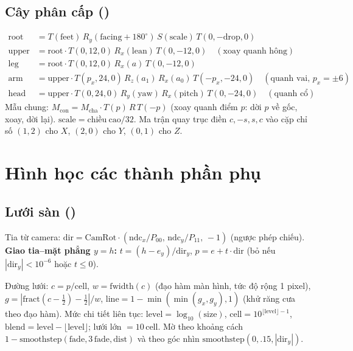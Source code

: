 \subsection{Cây phân cấp ()}
\begin{align*}
\mathrm{root}&=T(\mathrm{feet})\,R_y(\mathrm{facing}+180^\circ)\,S(\mathrm{scale})\,T(0,-\mathrm{drop},0)\\
\mathrm{upper}&=\mathrm{root}\cdot T(0,12,0)\,R_x(\mathrm{lean})\,T(0,-12,0)\quad(\text{xoay quanh hông})\\
\mathrm{leg}&=\mathrm{root}\cdot T(0,12,0)\,R_x(a)\,T(0,-12,0)\\
\mathrm{arm}&=\mathrm{upper}\cdot T(p_x,24,0)\,R_z(a_1)\,R_x(a_0)\,T(-p_x,-24,0)\quad(\text{quanh vai, }p_x=\pm6)\\
\mathrm{head}&=\mathrm{upper}\cdot T(0,24,0)\,R_y(\mathrm{yaw})\,R_x(\mathrm{pitch})\,T(0,-24,0)\quad(\text{quanh cổ})
\end{align*}
Mẫu chung: $M_{\mathrm{con}}=M_{\mathrm{cha}}\cdot T(p)\,R\,T(-p)$ (xoay quanh điểm $p$: dời $p$ về gốc, xoay, dời lại). $\mathrm{scale}=\mathrm{chiều\ cao}/32$. Ma trận quay trục  điền $c,-s,s,c$ vào cặp chỉ số $(1,2)$ cho $X$, $(2,0)$ cho $Y$, $(0,1)$ cho $Z$.

\section{Hình học các thành phần phụ}
\subsection{Lưới sàn ()}
Tia từ camera: $\mathrm{dir}=\mathrm{CamRot}\cdot(\mathrm{ndc}_x/P_{00},\,\mathrm{ndc}_y/P_{11},\,-1)$ (ngược phép chiếu). \textbf{Giao tia--mặt phẳng $y=h$:} $t=(h-e_y)/\mathrm{dir}_y$, $p=e+t\cdot\mathrm{dir}$ (bỏ nếu $|\mathrm{dir}_y|<10^{-6}$ hoặc $t\le0$).

Đường lưới: $c=p/\mathrm{cell}$, $w=\mathrm{fwidth}(c)$ (đạo hàm màn hình, tức độ rộng 1 pixel), $g=|\mathrm{fract}(c-\tfrac12)-\tfrac12|/w$, $\mathrm{line}=1-\min(\min(g_x,g_y),1)$ (khử răng cưa theo đạo hàm). Mức chi tiết liên tục: $\mathrm{level}=\log_{10}(\mathrm{size})$, $\mathrm{cell}=10^{\lfloor\mathrm{level}\rfloor-1}$, $\mathrm{blend}=\mathrm{level}-\lfloor\mathrm{level}\rfloor$; lưới lớn $=10\,\mathrm{cell}$. Mờ theo khoảng cách $1-\mathrm{smoothstep}(\mathrm{fade},3\,\mathrm{fade},\mathrm{dist})$ và theo góc nhìn $\mathrm{smoothstep}(0,.15,|\mathrm{dir}_y|)$.

